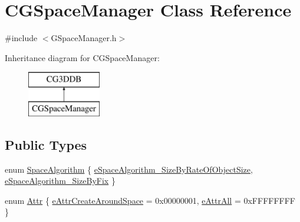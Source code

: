\hypertarget{class_c_g_space_manager}{}\section{C\+G\+Space\+Manager Class Reference}
\label{class_c_g_space_manager}


{\ttfamily \#include $<$G\+Space\+Manager.\+h$>$}

Inheritance diagram for C\+G\+Space\+Manager\+:\begin{figure}[H]
\begin{center}
\leavevmode
\includegraphics[height=2.000000cm]{class_c_g_space_manager}
\end{center}
\end{figure}
\subsection*{Public Types}
\begin{DoxyCompactItemize}
\item 
enum \hyperlink{class_c_g_space_manager_ad85e12e984c97163d3b89fe639e04987}{Space\+Algorithm} \{ \hyperlink{class_c_g_space_manager_ad85e12e984c97163d3b89fe639e04987a8c928d22fe87c9580896922de68935ef}{e\+Space\+Algorithm\+\_\+\+Size\+By\+Rate\+Of\+Object\+Size}, 
\hyperlink{class_c_g_space_manager_ad85e12e984c97163d3b89fe639e04987ad639be55ad871d0e3ecafa01fc6a6893}{e\+Space\+Algorithm\+\_\+\+Size\+By\+Fix}
 \}
\item 
enum \hyperlink{class_c_g_space_manager_acd1d45e0cfa5fd251c6c17f61654fbef}{Attr} \{ \hyperlink{class_c_g_space_manager_acd1d45e0cfa5fd251c6c17f61654fbefaf6578c104fcd37c846206ffdce405209}{e\+Attr\+Create\+Around\+Space} = 0x00000001, 
\hyperlink{class_c_g_space_manager_acd1d45e0cfa5fd251c6c17f61654fbefae4e406c7f88f01471fcbf05e22fcb8fb}{e\+Attr\+All} = 0x\+F\+F\+F\+F\+F\+F\+F\+F
 \}
\end{DoxyCompactItemize}
